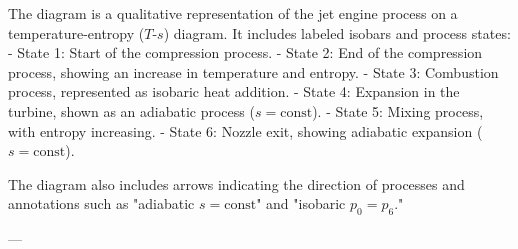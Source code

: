 The diagram is a qualitative representation of the jet engine process on a temperature-entropy (\( T \)-\( s \)) diagram. It includes labeled isobars and process states:  
- State 1: Start of the compression process.  
- State 2: End of the compression process, showing an increase in temperature and entropy.  
- State 3: Combustion process, represented as isobaric heat addition.  
- State 4: Expansion in the turbine, shown as an adiabatic process (\( s = \text{const} \)).  
- State 5: Mixing process, with entropy increasing.  
- State 6: Nozzle exit, showing adiabatic expansion (\( s = \text{const} \)).  

The diagram also includes arrows indicating the direction of processes and annotations such as "adiabatic \( s = \text{const} \)" and "isobaric \( p_0 = p_6 \)."  

---